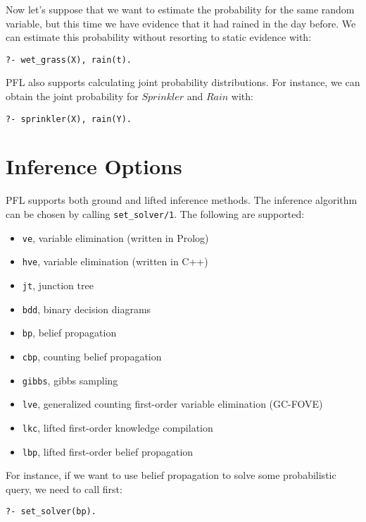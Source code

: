 \documentclass{article}
\begin{document}
Now let's suppose that we want to estimate the probability for the same random variable, but this time we have evidence that it had rained in the day before. We can estimate this probability without resorting to static evidence with:

\texttt{?- wet\_grass(X), rain(t).}

PFL also supports calculating joint probability distributions. For instance, we can obtain the joint probability for $Sprinkler$ and $Rain$ with:

\texttt{?- sprinkler(X), rain(Y).}



\section{Inference Options}
PFL supports both ground and lifted inference methods. The inference algorithm can be chosen by calling \texttt{set\_solver/1}. The following are supported:
\begin{itemize}
 \item \texttt{ve},  variable elimination (written in Prolog)
 \item \texttt{hve}, variable elimination (written in C++)
 \item \texttt{jt},  junction tree
 \item \texttt{bdd}, binary decision diagrams
 \item \texttt{bp},  belief propagation
 \item \texttt{cbp}, counting belief propagation
 \item \texttt{gibbs}, gibbs sampling
 \item \texttt{lve}, generalized counting first-order variable elimination (GC-FOVE)
 \item \texttt{lkc}, lifted first-order knowledge compilation
 \item \texttt{lbp}, lifted first-order belief propagation
\end{itemize}

For instance, if we want to use belief propagation to solve some probabilistic query, we need to call first:

\texttt{?- set\_solver(bp).}
\end{document}
